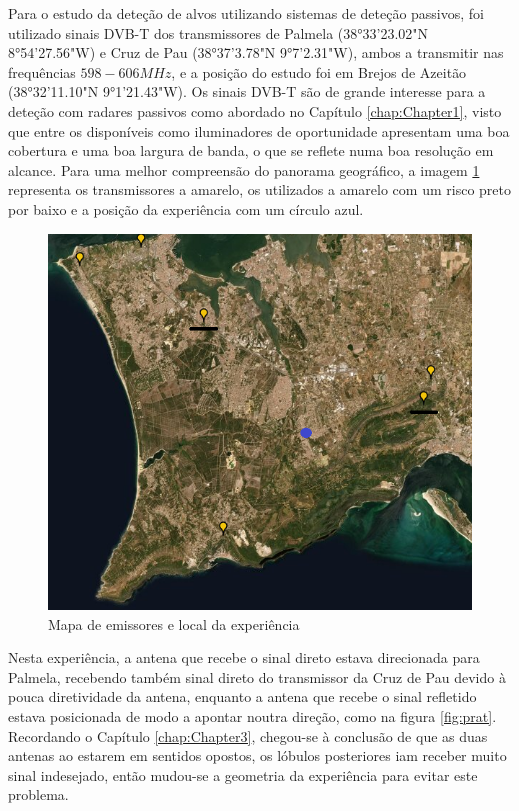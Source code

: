 Para o estudo da deteção de alvos utilizando sistemas de deteção passivos, foi utilizado sinais \gls{DVB-T} dos transmissores de Palmela (38°33'23.02"N	8°54'27.56"W) e Cruz de Pau (38°37'3.78"N	9°7'2.31"W), ambos a transmitir nas frequências $598-606 MHz$, e a posição do estudo foi em Brejos de Azeitão (38°32'11.10"N	9°1'21.43"W). Os sinais \gls{DVB-T} são de grande interesse para a deteção com radares passivos como abordado no Capítulo \ref{chap:Chapter1}, visto que entre os disponíveis como iluminadores de oportunidade apresentam uma boa cobertura e uma boa largura de banda, o que se reflete numa boa resolução em alcance. Para uma melhor compreensão do panorama geográfico, a imagem \ref{fig:mapaemi} representa os transmissores a amarelo,  os utilizados a amarelo com um risco preto por baixo e a posição da experiência com um círculo azul.\par 

\begin{figure}[h]
\centering
\includegraphics[scale=0.75]{chapters/ch5/assets/mapaemi}
\caption[Mapa de emissores e local da experiência]{Mapa de emissores e local da experiência}
\label{fig:mapaemi}
\end{figure}

Nesta experiência, a antena que recebe o sinal direto estava direcionada para Palmela, recebendo também sinal direto do transmissor da Cruz de Pau devido à pouca diretividade da antena, enquanto a antena que recebe o sinal refletido estava posicionada de modo a apontar noutra direção, como na figura \ref{fig:prat}. Recordando o Capítulo \ref{chap:Chapter3}, chegou-se à conclusão de que as duas antenas ao estarem em sentidos opostos, os lóbulos posteriores iam receber muito sinal indesejado, então mudou-se a geometria da experiência para evitar este problema.

